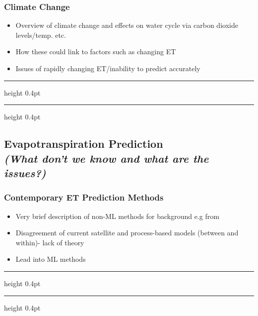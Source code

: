\documentclass[paper=a4, fontsize=12pt]{scrartcl}
\newcommand{\notedivider}{%
	\vspace{4pt}%
	{\hrule height 0.4pt}%
	\vspace{6pt}%
	{\hrule height 0.4pt}
	\vspace{6pt}
}
\begin{document}
	\subsubsection{Climate Change}
	\begin{itemize}
		\item Overview of climate change and effects on water cycle via carbon dioxide levels/temp. etc.
		\item How these could link to factors such as changing ET
		\item Issues of rapidly changing ET/inability to predict accurately
	\end{itemize}
	\notedivider
	
	\newpage
	\subsection{Evapotranspiration Prediction\\ \textit{(What don't we know and what are the issues?)}}
	\subsubsection{Contemporary ET Prediction Methods}
	\begin{itemize}
		\item Very brief description of non-ML methods for background e.g from \cite{xu2018evaluating}
		\item Disagreement of current satellite and process-based models (between and within)- lack of theory
		\item Lead into ML methods
	\end{itemize}
	\notedivider
	
\end{document}
